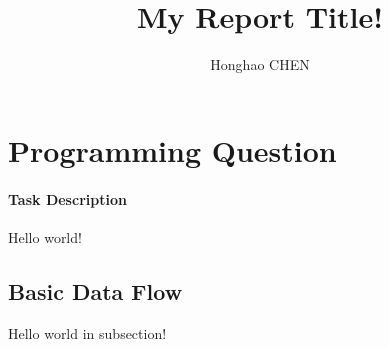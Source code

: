 \documentclass[11pt, a4paper]{article}
\title{My Report Title!}
\author{Honghao CHEN}
\begin{document}


\tableofcontents
\newpage

\section{Programming Question}

\paragraph{Task Description} Hello world!


\subsection{Basic Data Flow}

Hello world in subsection!
\end{document}
